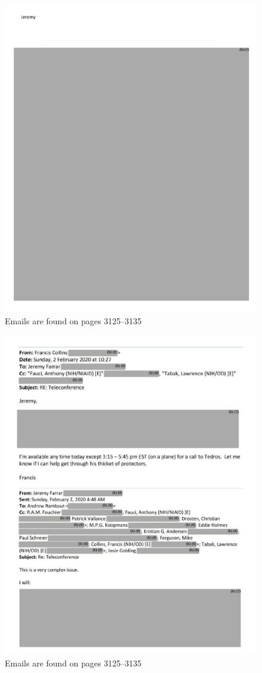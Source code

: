 \documentclass[11pt]{article}
\begin{document}
\begin{figure}[htbp]
\centering
\includegraphics[width=.9\linewidth]{./images/email-zh-2.png}
\caption{Emails are found on pages 3125--3135}
\end{figure}
\begin{figure}[htbp]
\centering
\includegraphics[width=.9\linewidth]{./images/email-zh-3.png}
\caption{Emails are found on pages 3125--3135}
\end{figure}
\end{document}
